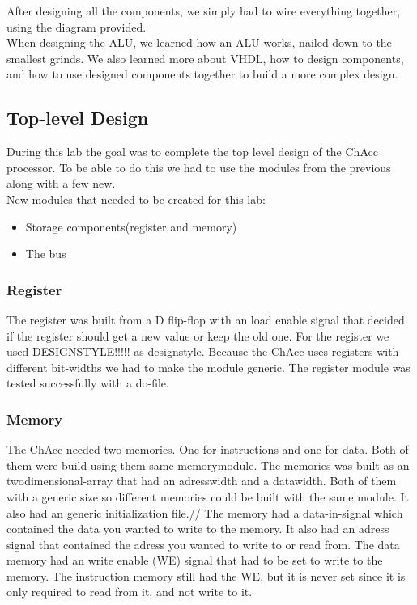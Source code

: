 \documentclass[a4paper]{article}
\begin{document}
After designing all the components, we simply had to wire everything together, using the diagram provided.\\

When designing the ALU, we learned how an ALU works, nailed down to the smallest grinds. We also learned more about VHDL, how to design components, and how to use designed components together to build a more complex design.
\subsection{Top-level Design}

During this lab the goal was to complete the top level design of the ChAcc processor.
To be able to do this we had to use the modules from the previous along with a few new.\\

New modules that needed to be created for this lab:

\begin{itemize}
	
    \item Storage components(register and memory)
    \item The bus
    
\end{itemize}

\subsubsection{Register}

The register was built from a D flip-flop with an load enable signal that decided if the register should get a new value or keep the old one.
For the register we used DESIGNSTYLE!!!!! as designstyle.
Because the ChAcc uses registers with different bit-widths we had to make the module generic. The register module was tested successfully with a do-file.

\subsubsection{Memory}

The ChAcc needed two memories. One for instructions and one for data.
Both of them were build using them same memorymodule.
The memories was built as an twodimensional-array that had an adresswidth and a datawidth. Both of them with a generic size so different memories could be built with the same module. It also had an generic initialization file.//
The memory had a data-in-signal which contained the data you wanted to write to the memory. It also had an adress signal that contained the adress you wanted to write to or read from.
The data memory had an write enable (WE) signal that had to be set to write to the memory.
The instruction memory still had the WE, but it is never set since it is only required to read from it, and not write to it.
\end{document}
